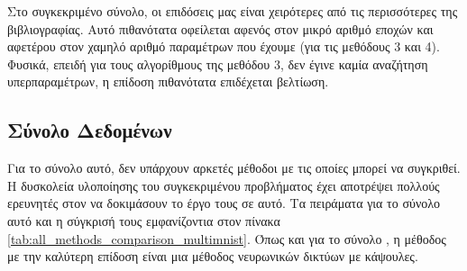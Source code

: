 Στο συγκεκριμένο σύνολο, οι επιδόσεις μας είναι χειρότερες από τις περισσότερες της βιβλιογραφίας. Αυτό πιθανότατα οφείλεται αφενός στον μικρό αριθμό εποχών και αφετέρου στον χαμηλό αριθμό παραμέτρων που έχουμε (για τις μεθόδους 3 και 4). Φυσικά, επειδή για τους αλγορίθμους της μεθόδου 3, δεν έγινε καμία αναζήτηση υπερπαραμέτρων, η επίδοση πιθανότατα επιδέχεται βελτίωση.

\subsection{Σύνολο Δεδομένων }

Για το σύνολο αυτό, δεν υπάρχουν αρκετές μέθοδοι με τις οποίες μπορεί να συγκριθεί. Η δυσκολεία υλοποίησης του συγκεκριμένου προβλήματος έχει αποτρέψει πολλούς ερευνητές στον να δοκιμάσουν το έργο τους σε αυτό. Τα πειράματα για το σύνολο αυτό και η σύγκρισή τους εμφανίζοντια στον πίνακα \ref{tab:all_methods_comparison_multimnist}. Όπως και για το σύνολο , η μέθοδος με την καλύτερη επίδοση είναι μια μέθοδος νευρωνικών δικτύων με κάψουλες.

